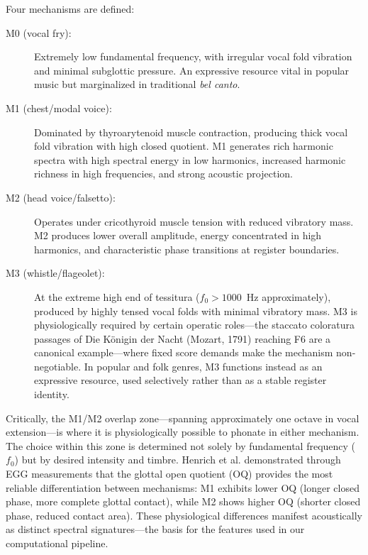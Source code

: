\documentclass[review,3p,number]{elsarticle}
\begin{document}
Four mechanisms are defined:

\begin{description}
  \item[M0 (vocal fry):] Extremely low fundamental frequency, with irregular vocal
    fold vibration and minimal subglottic pressure. An expressive resource vital in
    popular music but marginalized in traditional \emph{bel canto}.
  \item[M1 (chest/modal voice):] Dominated by thyroarytenoid muscle contraction,
    producing thick vocal fold vibration with high closed quotient. M1 generates
    rich harmonic spectra with high spectral energy in low harmonics, increased
    harmonic richness in high frequencies, and strong acoustic
    projection.\cite{henrich2004}
  \item[M2 (head voice/falsetto):] Operates under cricothyroid muscle tension with
    reduced vibratory mass. M2 produces lower overall amplitude, energy concentrated
    in high harmonics, and characteristic phase transitions at register
    boundaries.\cite{roubeau2009}
  \item[M3 (whistle/flageolet):] At the extreme high end of tessitura ($f_0 >
    1000$~Hz approximately), produced by highly tensed vocal folds with minimal
    vibratory mass. M3 is physiologically required by certain operatic roles---the
    staccato coloratura passages of Die Königin der Nacht (Mozart, 1791) reaching
    F6 are a canonical example---where fixed score demands make the mechanism
    non-negotiable. In popular and folk genres, M3 functions instead as an
    expressive resource, used selectively rather than as a stable register
    identity.
\end{description}

Critically, the M1/M2 overlap zone---spanning approximately one octave in vocal
extension---is where it is physiologically possible to phonate in either mechanism.
The choice within this zone is determined not solely by fundamental frequency ($f_0$)
but by desired intensity and timbre.\cite{roubeau2009,henrich2004} Henrich et
al.\cite{henrich2004} demonstrated through EGG measurements that the glottal open
quotient (OQ) provides the most reliable differentiation between mechanisms: M1
exhibits lower OQ (longer closed phase, more complete glottal contact), while M2
shows higher OQ (shorter closed phase, reduced contact area). These physiological
differences manifest acoustically as distinct spectral signatures---the basis for
the features used in our computational pipeline.
\end{document}
